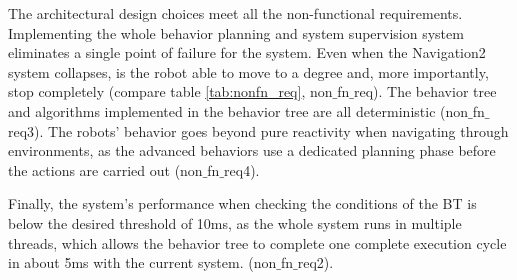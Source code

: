 \begin{table}[ht]
	\centering
	\caption{Results}
	\label{tab:results}
	\renewcommand{\arraystretch}{1.5}
\end{table} 

The architectural design choices meet all the non-functional requirements. Implementing the whole behavior planning and system supervision system eliminates a single point of failure for the system. Even when the Navigation2 system collapses, is the robot able to move to a degree and, more importantly, stop completely (compare table \ref{tab:nonfn_req}, non$\_$fn$\_$req). The behavior tree and algorithms implemented in the behavior tree are all deterministic (non$\_$fn$\_$req3). The robots' behavior goes beyond pure reactivity when navigating through environments, as the advanced behaviors use a dedicated planning phase before the actions are carried out (non$\_$fn$\_$req4). 

Finally, the system's performance when checking the conditions of the BT is below the desired threshold of 10ms, as the whole system runs in multiple threads, which allows the behavior tree to complete one complete execution cycle in about 5ms with the current system. (non$\_$fn$\_$req2). 